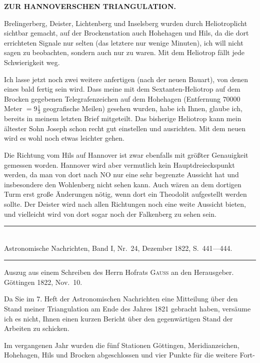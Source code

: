\par\clearpage
\noindent\null\hfill{\small\textbf{ZUR HANNOVERSCHEN TRIANGULATION.}}\hfill{}\par\medskip
\par\noindent\hspace*{\parindent}Brelingerberg, Deister, Lichtenberg und Inselsberg wurden durch Heliotroplicht sichtbar gemacht, auf der Brockenstation auch Hohehagen und Hils, da die dort errichteten Signale nur selten (das letztere nur wenige Minuten), ich will nicht sagen zu beobachten, sondern auch nur zu  waren. Mit dem Heliotrop fällt jede Schwierigkeit weg.
\par\noindent\hspace*{\parindent}Ich lasse jetzt noch zwei weitere anfertigen (nach der neuen Bauart), von denen eines bald fertig sein wird. Dass meine mit dem Sextanten-Heliotrop auf dem Brocken gegebenen Telegrafenzeichen auf dem Hohehagen (Entfernung \(70000\) Meter \(=9\frac{1}{3}\) geografische Meilen)  gesehen wurden, habe ich Ihnen, glaube ich, bereits in meinem letzten Brief mitgeteilt. Das bisherige Heliotrop kann mein ältester Sohn Joseph schon recht gut einstellen und ausrichten. Mit dem neuen wird es wohl noch etwas leichter gehen.
\par\noindent\hspace*{\parindent}Die Richtung vom Hils auf Hannover ist zwar ebenfalls mit größter Genauigkeit gemessen worden. Hannover wird aber vermutlich kein Hauptdreieckspunkt werden, da man von dort nach NO nur eine sehr begrenzte Aussicht hat und insbesondere den Wohlenberg nicht sehen kann. Auch wären an dem dortigen Turm erst große Änderungen nötig, wenn dort ein Theodolit aufgestellt werden sollte. Der Deister wird nach allen Richtungen noch eine weite Aussicht bieten, und vielleicht wird von dort sogar noch der Falkenberg zu sehen sein.
\begin{center}
\rule{.74\linewidth}{.4pt}\\[-.5ex]
{\small Astronomische Nachrichten, Band I, Nr.~24, Dezember 1822, S.~441---444.}\\[-.5ex]
\rule{.74\linewidth}{.4pt}\par\medskip
Auszug aus einem Schreiben des Herrn Hofrats \textsc{Gauss} an den Herausgeber.\\
Göttingen 1822, Nov.~10.
\end{center}
\par\noindent\hspace*{\parindent}Da Sie im \(7.\) Heft der Astronomischen Nachrichten eine Mitteilung über den Stand meiner Triangulation am Ende des Jahres 1821 gebracht haben, versäume ich es nicht, Ihnen einen kurzen Bericht über den gegenwärtigen Stand der Arbeiten zu schicken.
\par\noindent\hspace*{\parindent}Im vergangenen Jahr wurden die fünf Stationen Göttingen, Meridianzeichen, Hohehagen, Hils und Brocken abgeschlossen und vier Punkte für die weitere Fort-

